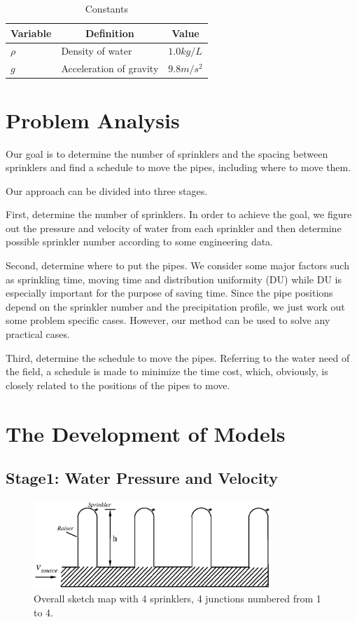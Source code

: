 \documentclass[12pt,a4paper,titlepage]{article}
\begin{document}
\begin{table}[!htb]
\centering \caption{Constants}
\begin{tabular}{lll}
\hline
\multicolumn{1}{c}{Variable} & \multicolumn{1}{c}{Definition} & \multicolumn{1}{c}{Value} \\
\hline
$ \rho$ & Density of water & $1.0kg/L$ \\
$g$ & Acceleration of gravity & $9.8m/s^2$ \\
\hline
\end{tabular}
\end{table}

\section{Problem Analysis}

Our goal is to determine the number of sprinklers and the spacing
between sprinklers and find a schedule to move the pipes,
including where to move them.

Our approach can be divided into three stages.

First, determine the number of sprinklers. In order to achieve the
goal, we figure out the pressure and velocity of water from each
sprinkler and then determine possible sprinkler number according
to some engineering data.

Second, determine where to put the pipes. We consider some major
factors such as sprinkling time, moving time and distribution
uniformity (DU) while DU is especially important for the purpose
of saving time. Since the pipe positions depend on the sprinkler
number and the precipitation profile, we just work out some
problem specific cases. However, our method can be used to solve
any practical cases.

Third, determine the schedule to move the pipes. Referring to the
water need of the field, a schedule is made to minimize the time
cost, which, obviously, is closely related to the positions of the
pipes to move.

\section{The Development of Models}

\subsection{Stage1: Water Pressure and Velocity}

\begin{figure}[!htb]
\centering
\includegraphics[width=0.8\textwidth]{fig01.eps}
\caption{\label{fig01} Overall sketch map with 4 sprinklers, 4
junctions numbered from 1 to 4.}
\end{figure}
\end{document}
